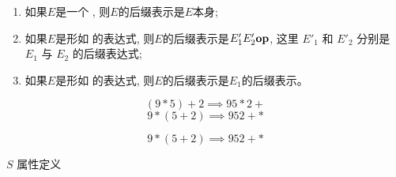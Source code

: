 
\begin{frame}{}
  \begin{definition}
    \begin{enumerate}[(1)]
      \setlength{\itemsep}{8pt}
      \item 如果$E$是一个 , 则$E$的后缀表示是$E$本身;
      \item 如果$E$是形如  的表达式,
        则$E$的后缀表示是$E'_{1} E'_{2} \text{\bf op}$,
        这里 $E'_{1}$ 和 $E'_{2}$ 分别是 $E_{1}$ 与 $E_{2}$ 的后缀表达式;
      \item 如果$E$是形如  的表达式, 则$E$的后缀表示是$E_{1}$的后缀表示。
    \end{enumerate}
  \end{definition}

  \begin{center}
    \[
      (9 * 5)+2 \implies 95*2+
    \]
    \[
      9 * (5+2) \implies 952+*
    \]
  \end{center}
\end{frame}

\begin{frame}{}
  \begin{center}
	\end{center}

	\vspace{-0.30cm}
	\[
		9 * (5+2) \implies 952+*
	\]
\end{frame}

\begin{frame}{}
  \begin{center}
     $S$ 属性定义

		\vspace{0.50cm}
	\end{center}
\end{frame}
